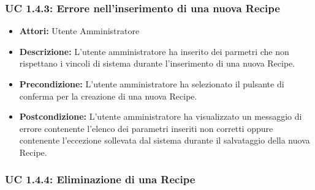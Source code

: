 \subsubsection{UC 1.4.3: Errore nell'inserimento di una nuova Recipe}

\begin{itemize}
    \item \textbf{Attori:} Utente Amministratore
    \item \textbf{Descrizione:} L'utente amministratore ha inserito dei parmetri che non rispettano i vincoli di sistema durante l'inserimento di una nuova Recipe.
    \item \textbf{Precondizione:} L'utente amministratore ha selezionato il pulsante di conferma per la creazione di una nuova Recipe.
    \item \textbf{Postcondizione:} L'utente amministratore ha visualizzato un messaggio di errore contenente l'elenco dei parametri inseriti non corretti oppure contenente l'eccezione sollevata dal sistema durante il salvataggio della nuova Recipe.
\end{itemize}

\subsubsection{UC 1.4.4: Eliminazione di una Recipe}

